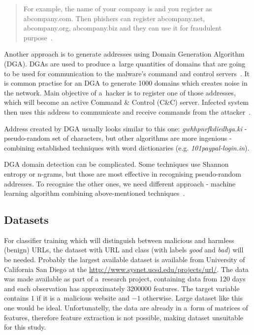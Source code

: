\begin{quote}
    For example, the name of your company is  and you register as abcompany.com.
    Then phishers can register abcompany.net, abcompany.org, abcompany.biz and they can use it for fraudulent purpose~\cite{towards_data_science_phishing_url}.
\end{quote}

Another approach is to generate addresses using Domain Generation Algorithm (DGA).
DGAs are used to produce a~large quantities of domains that are going to be used for communication to the malware's command and control servers~\cite{oracle_dga_scarfo}.
It is common practise for an DGA to generate 1000 domains which creates noise in the network.
Main objective of a~hacker is to register one of those addresses, which will become an active Command \& Control (C\&C) server.
Infected system then uses this address to communicate and receive commands from the attacker~\cite{what_are_dgas}.

Address created by DGA usually looks similar to this one: \textit{gwhhpnrfkdiedhga.ki} - pseudo-random set of characters, but other algorithms are more ingenious - combining established techniques with word dictionaries (e.g. \textit{101paypal-login.in}).

DGA domain detection can be complicated.
Some techniques use Shannon entropy or n-grams, but those are most effective in recognising pseudo-random addresses.
To recognise the other ones, we need different approach - machine learning algorithm combining above-mentioned techniques~\cite{building_dga_classifier,what_are_dgas,entropy_dns}.

\subsection{Datasets}\label{subsec:datasets}

For classifier training which will distinguish between malicious and harmless (benign) URLs, the dataset with URL and class (with labels \textit{good} and \textit{bad}) will be needed.
Probably the largest available dataset is available from University of California San Diego at the \url{http://www.sysnet.ucsd.edu/projects/url/}.
The data was made available as part of a~research project, containing data from 120 days and each observation has approximately \num{3200000} features.
The target variable contains \( 1 \) if it is a~malicious website and \( -1 \) otherwise.
Large dataset like this one would be ideal.
Unfortunatelly, the data are already in a~form of matrices of features, therefore feature extraction is not possible, making dataset unsuitable for this study.

